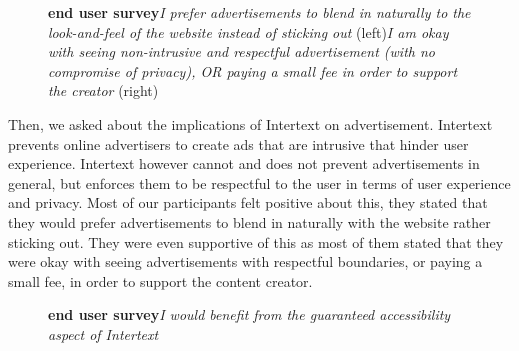 
\begin{figure}[H]
\centering
{}
\vspace*{-5mm}
\caption{\textbf{end user survey}\newline\textit{I prefer advertisements to blend in naturally to the look-and-feel of the website instead of sticking out} (left)\newline\textit{I am okay with seeing non-intrusive and respectful advertisement (with no compromise of privacy), OR paying a small fee in order to support the creator} (right)} \label{fig:ev_p2_2}
\end{figure}

Then, we asked about the implications of Intertext on advertisement. Intertext prevents online advertisers to create ads that are intrusive that hinder user experience. Intertext however cannot and does not prevent advertisements in general, but enforces them to be respectful to the user in terms of user experience and privacy. Most of our participants felt positive about this, they stated that they would prefer advertisements to blend in naturally with the website rather sticking out. They were even supportive of this as most of them stated that they were okay with seeing advertisements with respectful boundaries, or paying a small fee, in order to support the content creator.


\begin{figure}[H]
\centering
{}
\vspace*{-1mm}
\caption{\textbf{end user survey}\newline\textit{I would benefit from the guaranteed accessibility aspect of Intertext}} \label{fig:ev_p2_3}
\end{figure}

